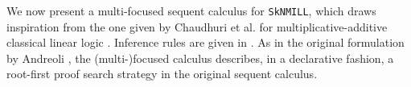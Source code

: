 \documentclass[runningheads]{llncs}
\newcommand{\tl}{\otimes \mathsf{L}}
\newcommand{\lright}{{\multimap}\mathsf{R}}
\newcommand{\lleft}{{\multimap}\mathsf{L}}
\newcommand{\pass}{\mathsf{pass}}
\newcommand{\unitl}{\mathsf{IL}}
\newcommand{\otL}{\tl}
\newcommand{\lolliR}{\lright}
\newcommand{\lolliL}{\lleft}
\newcommand{\IL}{\unitl}
\newcommand{\ax}{\mathsf{ax}}
\newcommand{\ot}{\otimes}
\newcommand{\lolli}{\multimap}
\newcommand{\I}{\mathsf{I}}
\newcommand{\SkNMILL}{\texttt{SkNMILL}}
\newcommand{\up}{\Uparrow}
\newcommand{\dn}{\Downarrow}
\newcommand{\focL}{\mathsf{foc_L}}
\newcommand{\foc}{\mathsf{foc}}
\newcommand{\focR}{\mathsf{foc_R}}
\newcommand{\blurL}{\mathsf{blur_L}}
\newcommand{\unfoc}{\mathsf{unfoc}}
\begin{document}
We now present a multi-focused sequent calculus for \SkNMILL, which draws  inspiration from   the one given by Chaudhuri et al. for multiplicative-additive classical linear logic \cite{chaudhuri:canonical:2008}. Inference rules are given in . As in the original formulation by Andreoli \cite{andreoli:logic:1992}, the (multi-)focused calculus describes, in a declarative fashion, a root-first proof search strategy in the original sequent calculus.
\end{document}
